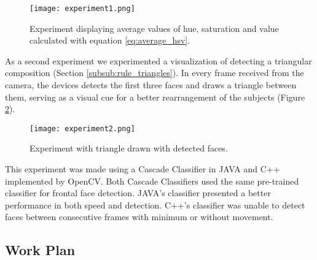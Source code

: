 \begin{figure}[htbp]
    \centering
    \texttt{[image: experiment1.png]}
	\caption{Experiment displaying average values of hue, saturation and value calculated with equation \ref{eq:average_hsv}\cite{Datta}.}
	\label{fig:experiment1}
\end{figure}

As a second experiment we experimented a visualization of detecting a triangular composition (Section \ref{subsub:rule_triangles}). In every frame received from the camera, the devices detects the first three faces and draws a triangle between them, serving as a visual cue for a better rearrangement of the subjects (Figure \ref{fig:experiment2}).

\begin{figure}[htbp]
    \centering
    \texttt{[image: experiment2.png]}
	\caption{Experiment with triangle drawn with detected faces.}
	\label{fig:experiment2}
\end{figure}

This experiment was made using a Cascade Classifier in JAVA and C++ implemented by OpenCV. Both Cascade Classifiers used the same pre-trained classifier for frontal face detection. JAVA's classifier presented a better performance in both speed and detection. C++'s classifier was unable to detect faces between consecutive frames with minimum or without movement.
\subsection{Work Plan}